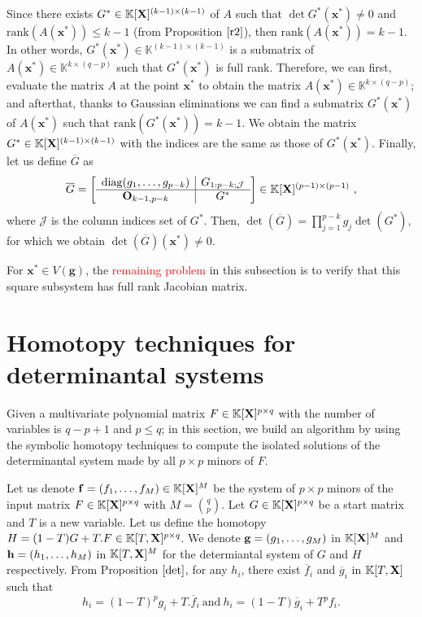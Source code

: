 \documentclass[11pt]{article}
\numberwithin{Property}{section}
\numberwithin{Theorem}{section}
\numberwithin{Proposition}{section}
\numberwithin{Lemma}{section}
\numberwithin{Corollary}{section}
\numberwithin{Definition}{section}
\numberwithin{Remark}{section}
\numberwithin{Conjecture}{section}
\numberwithin{Problem}{section}
\numberwithin{Claim}{section}
\theoremstyle{definition}
\numberwithin{Example}{section}
\def\g {\ensuremath{\mathbf{g}}}
\renewcommand{\leq}{\leqslant}
\def\bar{\overline}
\newcommand{\field}{\mathbb{K}} %
\newcommand{\mat}[1]{\mathbf{\MakeUppercase{#1}}} %
\newcommand{\todo}[1]{\textcolor{red}{#1}} %
\begin{document}
Since there exists ${G}^* \in \field[\mat{X}]^{(k-1) \times (k-1)}$  of $A$ such that $\det{{G}^*}(\mathbf{x}^*) \ne 0$ and $\mathrm{rank}(A(\mathbf{x}^{*})) \leq k-1$ (from Proposition $\ref{r2}$), then $\mathrm{rank}(A(\mathbf{x}^{*})) = k-1$. In other words, ${G}^*(\mathbf{x}^*) \in \field^{(k-1)\times (k-1)}$ is a submatrix of $A(\mathbf{x}^*) \in \field^{k \times (q-p)}$ such that ${G}^*(\mathbf{x}^*)$ is full rank. Therefore, we can first, evaluate the matrix $A$ at the point $\mathbf{x}^*$ to obtain the matrix $A(\mathbf{x}^*) \in \field^{k \times (q-p)}$; and afterthat, thanks to Gaussian eliminations we can find a submatrix ${G}^*(\mathbf{x}^*)$ of $A(\mathbf{x}^*)$ such that $\mathrm{rank}({G}^*(\mathbf{x}^*)) = k-1$.  We obtain the matrix ${G}^* \in \field[\mat{X}]^{(k-1) \times (k-1)}$ with the indices are the same as those of ${G}^*(\mathbf{x}^*)$. Finally, let us define $\bar{G}$ as 
\[\bar{G} = 
\left[\begin{array}{c |c}%
\mathrm{diag}(g_1, \ldots, g_{p-k}) & G_{1:p-k; \mathcal{J}} \\  \hline
\mat{O}_{k-1,p-k} & G^*\\
\end{array}
\right] \in \field[\mat{X}]^{(p-1) \times (p-1)} \ ,\] where $\mathcal{J}$ is the column indices set of $G^*$. Then, $\det(\bar{G}) = \prod_{j = 1}^{p-k}g_j\det(G^*)$, for which we obtain $\det(\bar{G})(\mathbf{x}^*) \ne 0$.

For $\mathbf{x}^* \in V(\g)$, the \todo{remaining problem} in this subsection is to verify that this square subsystem has full rank Jacobian matrix. 
\section{Homotopy techniques for determinantal systems} 
\label{sec:Algorithms}
Given a multivariate polynomial matrix $F \in \field[\mat{X}]^{p \times q}$ with the number of variables is $q-p+1$ and $p \leq q$; in this section, we build an algorithm by using the symbolic homotopy techniques to compute the isolated solutions of the determinantal system made by all $p \times p$ minors of $F$. 

Let us denote ${\bf{f}} = (f_1, \ldots, f_M) \in \field[{\mat{X}}]^M$ be the system of $p \times p$ minors of the input matrix $F \in \field[\mat{X}]^{p \times q}$ with $M = {{q}\choose{p}}$. Let $G \in \field[\mat{X}]^{p \times q}$ be a start matrix and $T$ is a new variable. Let us define the homotopy $H = (1-T)G + T.F \in \field[T,\mat{X}]^{p \times q}$. We denote ${\bf g} = (g_1, \ldots, g_M)$ in $\field[\mat{X}]^M$ and ${\bf h} = (h_1, \ldots, h_M)$ in $\field[T,\mat{X}]^M$ for the determiantal system of $G$ and $H$ respectively. From Proposition $\ref{det}$, for any $h_i$, there exist $\bar{f}_i$ and $\bar{g}_i$ in $\field[T, \mat{X}]$ such that 
\begin{equation} \label{deteq}
h_i = (1-T)^pg_i + T.\bar{f}_{i} \ \mathrm{and} \ h_i = (1-T)\bar{g}_i + T^pf_i.
\end{equation}
\end{document}
